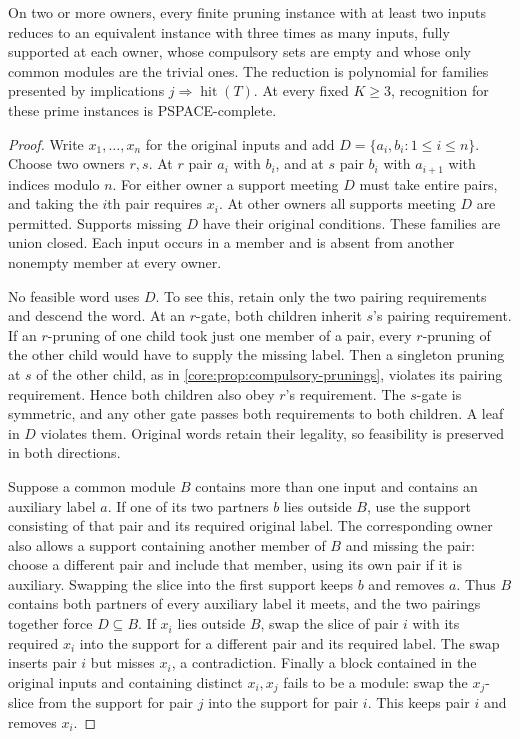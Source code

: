 \begin{theorem}
\label{core:thm:prime-pruning-hardness}
On two or more owners, every finite pruning instance with at least
two inputs reduces to an equivalent instance with three times as
many inputs, fully supported at each owner, whose compulsory sets
are empty and whose only common modules are the trivial ones.
The reduction is polynomial for families presented by implications
$j\Rightarrow\operatorname{hit}(T)$. At every fixed $K\ge3$,
recognition for these prime instances is PSPACE-complete.
\end{theorem}
\begin{proof}
Write $x_1,\ldots,x_n$ for the original inputs and add
$D=\{a_i,b_i:1\le i\le n\}$. Choose two owners $r,s$. At $r$ pair
$a_i$ with $b_i$, and at $s$ pair $b_i$ with $a_{i+1}$ with indices
modulo $n$. For either owner a support meeting $D$ must take entire
pairs, and taking the $i$th pair requires $x_i$. At other owners
all supports meeting $D$ are permitted. Supports missing $D$
have their original conditions. These families are union closed.
Each input occurs in a member and is absent from another nonempty
member at every owner.

No feasible word uses $D$. To see this, retain only the two
pairing requirements and descend the word. At an $r$-gate,
both children inherit $s$'s pairing requirement. If an $r$-pruning
of one child took just one member of a pair, every $r$-pruning of
the other child would have to supply the missing label. Then a
singleton pruning at $s$ of the other child, as in
\cref{core:prop:compulsory-prunings}, violates its pairing
requirement. Hence both children also obey $r$'s requirement.
The $s$-gate is symmetric, and any other gate passes both
requirements to both children. A leaf in $D$ violates them.
Original words retain their legality, so feasibility is preserved
in both directions.

Suppose a common module $B$ contains more than one input and
contains an auxiliary label $a$. If one of its two partners $b$
lies outside $B$, use the support consisting of that pair and its
required original label. The corresponding owner also allows a
support containing another member of $B$ and missing the pair:
choose a different pair and include that member, using its own
pair if it is auxiliary. Swapping the slice into the first support
keeps $b$ and removes $a$. Thus $B$ contains both partners of
every auxiliary label it meets, and the two pairings together
force $D\subseteq B$. If $x_i$ lies outside $B$, swap the slice
of pair $i$ with its required $x_i$ into the support for a different
pair and its required label. The swap inserts pair $i$ but misses
$x_i$, a contradiction. Finally a block contained in the original
inputs and containing distinct $x_i,x_j$ fails to be a module:
swap the $x_j$-slice from the support for pair $j$ into the support
for pair $i$. This keeps pair $i$ and removes $x_i$.


\end{proof}
